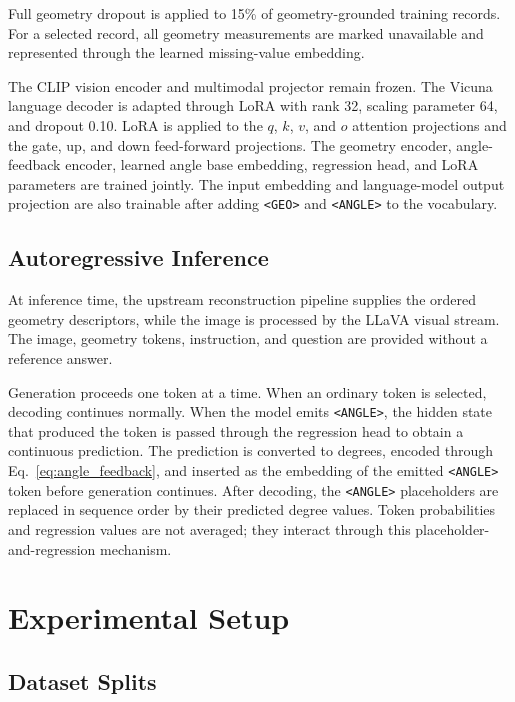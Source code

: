 Full geometry dropout is applied to 15\% of geometry-grounded training
records. For a selected record, all geometry measurements are marked
unavailable and represented through the learned missing-value embedding.

The CLIP vision encoder and multimodal projector remain frozen. The
Vicuna language decoder is adapted through LoRA with rank 32, scaling
parameter 64, and dropout 0.10. LoRA is applied to the
$q$, $k$, $v$, and $o$ attention projections and the gate, up, and down
feed-forward projections. The geometry encoder, angle-feedback encoder,
learned angle base embedding, regression head, and LoRA parameters are
trained jointly. The input embedding and language-model output
projection are also trainable after adding \texttt{<GEO>} and
\texttt{<ANGLE>} to the vocabulary.

\subsection{Autoregressive Inference}
\label{sec:inference}

At inference time, the upstream reconstruction pipeline supplies the
ordered geometry descriptors, while the image is processed by the
LLaVA visual stream. The image, geometry tokens, instruction, and
question are provided without a reference answer.

Generation proceeds one token at a time. When an ordinary token is
selected, decoding continues normally. When the model emits
\texttt{<ANGLE>}, the hidden state that produced the token is passed
through the regression head to obtain a continuous prediction. The
prediction is converted to degrees, encoded through
Eq.~\eqref{eq:angle_feedback}, and inserted as the embedding of the
emitted \texttt{<ANGLE>} token before generation continues. After
decoding, the \texttt{<ANGLE>} placeholders are replaced in sequence
order by their predicted degree values. Token probabilities and
regression values are not averaged; they interact through this
placeholder-and-regression mechanism.

\section{Experimental Setup}
\label{sec:experimental_setup}

\subsection{Dataset Splits}
\label{sec:dataset_splits}

